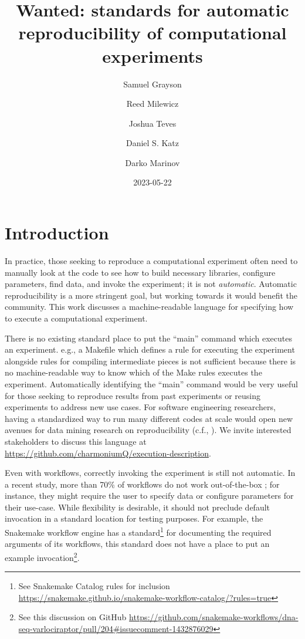 \documentclass[manuscript]{acmart}
\title{Wanted: standards for automatic reproducibility of computational
experiments}
\author{Samuel Grayson}
\affiliation{%
    \institution{University of Illinois Urbana-Champaign}%
    \department{Department of Computer Science}%
    \streetaddress{201 North Goodwin Avenue MC 258}%
    \city{Urbana}%
    \state{IL}%
    \postcode{61801-2302}%
    \country{USA}%
    }
\author{Reed Milewicz}
\affiliation{%
    \institution{Sandia National Laboratories}%
    \department{Software Engineering and Research Department}%
    \streetaddress{1515 Eubank Blvd SE1515 Eubank Blvd SE}%
    \city{Albuquerque}%
    \state{NM}%
    \postcode{87123}%
    \country{USA}%
    }
\author{Joshua Teves}
\affiliation{%
    \institution{Sandia National Laboratories}%
    \department{Software Engineering and Research Department}%
    \streetaddress{1515 Eubank Blvd SE1515 Eubank Blvd SE}%
    \city{Albuquerque}%
    \state{NM}%
    \postcode{87123}%
    \country{USA}%
    }
\author{Daniel S. Katz}
\affiliation{%
    \institution{University of Illinois Urbana-Champaign Department of
Computer Science}%
    \department{Department of Computer Science}%
    \streetaddress{201 North Goodwin Avenue MC 258}%
    \city{Urbana}%
    \state{IL}%
    \postcode{61801-2302}%
    \country{USA}%
    }
\author{Darko Marinov}
\affiliation{%
    \institution{University of Illinois Urbana-Champaign}%
    \department{Department of Computer Science}%
    \streetaddress{201 North Goodwin Avenue MC 258}%
    \city{Urbana}%
    \state{IL}%
    \postcode{61801-2302}%
    \country{USA}%
    }
\date{2023-05-22}
\begin{document}
\maketitle

\renewcommand{\shortauthors}{Grayson et al.}


\hypertarget{introduction}{%
\section{Introduction}\label{introduction}}

In practice, those seeking to reproduce a computational experiment often
need to manually look at the code to see how to build necessary
libraries, configure parameters, find data, and invoke the experiment;
it is not \emph{automatic}. Automatic reproducibility is a more
stringent goal, but working towards it would benefit the community. This
work discusses a machine-readable language for specifying how to execute
a computational experiment.

There is no existing standard place to put the ``main'' command which
executes an experiment. e.g., a Makefile which defines a rule for
executing the experiment alongside rules for compiling intermediate
pieces is not sufficient because there is no machine-readable way to
know which of the Make rules executes the experiment. Automatically
identifying the ``main'' command would be very useful for those seeking
to reproduce results from past experiments or reusing experiments to
address new use cases. For software engineering researchers, having a
standardized way to run many different codes at scale would open new
avenues for data mining research on reproducibility (c.f.,
\cite{collberg_repeatability_2016,zhao_why_2012,trisovic_large-scale_2022}).
We invite interested stakeholders to discuss this language at
\url{https://github.com/charmoniumQ/execution-description}.

Even with workflows, correctly invoking the experiment is still not
automatic. In a recent study, more than 70\% of workflows do not work
out-of-the-box \cite{grayson_automatic_2023}; for instance, they might
require the user to specify data or configure parameters for their
use-case. While flexibility is desirable, it should not preclude default
invocation in a standard location for testing purposes. For example, the
Snakemake workflow engine has a standard\footnote{See Snakemake Catalog
  rules for inclusion
  \url{https://snakemake.github.io/snakemake-workflow-catalog/?rules=true}}
for documenting the required arguments of its workflows, this standard
does not have a place to put an example invocation\footnote{See this
  discussion on GitHub
  \url{https://github.com/snakemake-workflows/dna-seq-varlociraptor/pull/204\#issuecomment-1432876029}}.
\end{document}
